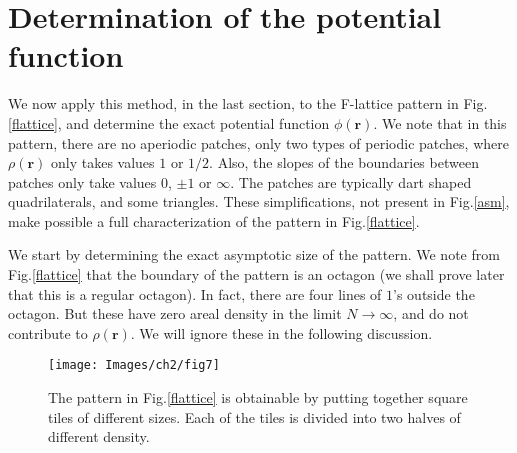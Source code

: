 \documentclass[11pt,a4paper]{book}
\begin{document}
\section{Determination of the potential function}
We now apply this method, in the last section, to the F-lattice pattern
in Fig. \ref{flattice}, and determine the exact potential function $\phi\left(
\mathbf{r}\right)$. We note that in this
pattern, there are no aperiodic patches, 
only two types of periodic patches, where $\rho(\mathbf{r})$ only
takes values $1$ or $1/2$. Also, the slopes of the boundaries between patches 
only take values $0$, $\pm1$ or $\infty$. The patches are typically dart 
shaped quadrilaterals, and some triangles. These 
simplifications, not present in Fig.\ref{asm}, make possible a full 
characterization of the pattern in Fig.\ref{flattice}.

We start by determining the exact asymptotic size of the pattern. We
note from Fig.\ref{flattice} that the boundary of the pattern is an octagon
(we shall prove later that this is a regular octagon). In fact, there
are four lines of $1$'s outside the octagon. But these have zero areal
density in the limit $N\rightarrow \infty$, and do not contribute to 
$\rho(\mathbf{r})$. We will ignore these  in the following discussion.
\begin{SCfigure}
 \texttt{[image: Images/ch2/fig7]}
 \caption{The pattern in 
 Fig.\ref{flattice} is obtainable by putting together square tiles of 
 different sizes. Each of the tiles is divided into two halves of 
 different density.}
 \label{tile}
\end{SCfigure}
\end{document}
